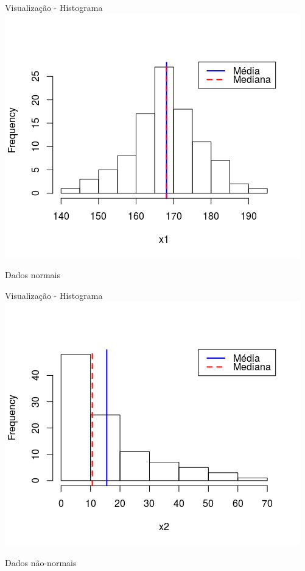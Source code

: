 \documentclass{beamer}
\begin{document}
\begin{frame}{Visualização - Histograma}
  \centering
  \includegraphics[width=.7\textwidth]{Nao_Param/normal2-h}

  Dados normais
\end{frame}

\begin{frame}{Visualização - Histograma}
  \centering
  \includegraphics[width=.7\textwidth]{Nao_Param/lognormal2-h}

  Dados não-normais
\end{frame}
\end{document}

